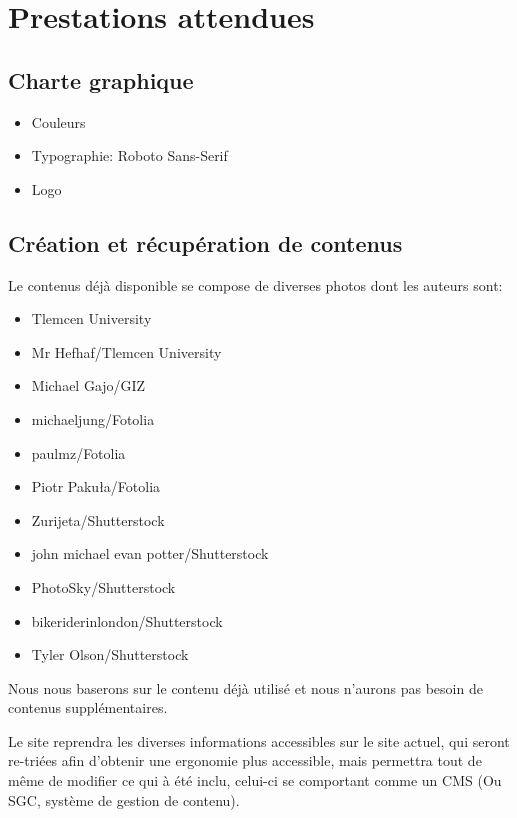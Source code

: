 \documentclass[oneside]{report}
\newcommand{\writecol}[1] {
	\subitem{\textcolor[HTML]{#1}{\# #1}}
}
\begin{document}
	\chapter{Prestations attendues}
	{
		\section{Charte graphique}
			\begin{itemize}
				\item{Couleurs}
					\writecol{639D35}
					\writecol{040707}
					\writecol{868786}
					\writecol{005899}
				\item{Typographie: Roboto Sans-Serif}
				\item{Logo}
			\end{itemize}
		\section{Création et récupération de contenus}
		{
			\par Le contenus déjà disponible se compose de diverses photos dont les auteurs sont:
			\vspace{.5cm}
			\begin{itemize}
				\item Tlemcen University
				\item Mr Hefhaf/Tlemcen University
				\item Michael Gajo/GIZ
				\item michaeljung/Fotolia
				\item paulmz/Fotolia
				\item Piotr Pakuła/Fotolia
				\item Zurijeta/Shutterstock
				\item john michael evan potter/Shutterstock
				\item PhotoSky/Shutterstock
				\item bikeriderinlondon/Shutterstock
				\item Tyler Olson/Shutterstock
			\end{itemize}
			\vspace{.5cm}
			\par Nous nous baserons sur le contenu déjà utilisé et nous n'aurons pas besoin de contenus supplémentaires.
			\vspace{.5cm}
			\par Le site reprendra les diverses informations accessibles sur le site actuel, qui seront re-triées afin d’obtenir une ergonomie plus accessible, mais permettra tout de même de modifier ce qui à été inclu, celui-ci se comportant comme un CMS (Ou SGC, système de gestion de contenu).
		}
}
\end{document}
